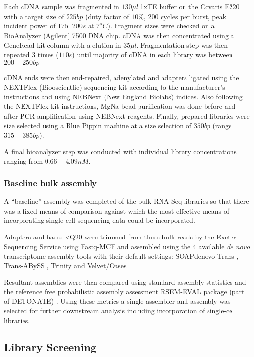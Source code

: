 Each cDNA sample was fragmented in \(130\mu l\) 1xTE buffer on the Covaris E220 
with a target size of \(225bp\) (duty factor of \(10\%\), 200 cycles per burst, peak incident power
of 175, \(200s\) at \(7^{o}C\)). Fragment sizes were checked on a BioAnalyzer (Agilent) 7500 DNA chip.
cDNA was then concentrated using a GeneRead kit column with a elution in \(35\mu l\). Fragmentation
step was then repeated 3 times (\(110s\)) until majority of cDNA in each library was between \(200-250bp\)

cDNA ends were then end-repaired, adenylated and adapters ligated using the NEXTFlex (Biooscientfic) sequencing kit 
according to the manufacturer's instructions and using NEBNext (New England Biolabs) indices.  Also following
the NEXTFlex kit instructions, MgNa bead purification was done before and after PCR amplification using
NEBNext reagents.  Finally, prepared libraries were size selected using a Blue Pippin machine at a size selection
of \(350bp\) (range \(315-385bp\)).

A final bioanalyzer step was conducted with individual library concentrations ranging from \(0.66-4.09nM\).

\subsubsection{Baseline bulk assembly}

A ``baseline'' assembly was completed of the bulk RNA-Seq libraries so that there was a fixed
means of comparison against which the most effective means of incorporating single cell
sequencing data could be incorporated.

Adapters and bases <Q20 were trimmed from these bulk reads by the Exeter Sequencing Service
using Fastq-MCF \citep{Aronesty2013} and assembled using the 4 available \textit{de novo} 
transcriptome assembly tools with their default settings: SOAPdenovo-Trans \citep{Xie2014}, 
Trans-ABySS \citep{Robertson2010}, Trinity \citep{Haas2013} and Velvet/Oases \citep{Schulz2012a}

Resultant assemblies were then compared using standard assembly statistics and the reference
free probabilistic assembly assessment RSEM-EVAL package (part of DETONATE) \citep{Li2014}.
Using these metrics a single assembler and assembly was selected for further downstream
analysis including incorporation of single-cell libraries.


\subsection{Library Screening}

